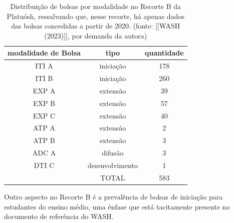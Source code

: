 \documentclass[
12pt,		%
openright,	%
twoside,  %
a4paper,			%
chapter=TITLE,		%
english,			%
french,				%
spanish,			%
brazil				%
]{USPSC-classe/USPSC}
\begin{document}
\noindent\begin{center}\mbox{\centering{}}\end{center}






\begin{table}[htb]
\tiny
\caption{\label{cebf2cae2f56b26b99c8f02cfed1eaed55d30c05}Distribui\c{c}\~ao de bolsas por modalidade no Recorte B da Platu\'osh, ressalvando que, nesse recorte, h\'a apenas dados das bolsas concedidas a partir de 2020. (fonte:  [[WASH (2023)]], por demanda da autora)}

\centering
\begin{tabular}{|c|c|c|}
\hline
modalidade de Bolsa  &  tipo  &  quantidade \\
\hline
ITI A  &  inicia\c{c}\~ao  &  178 \\
ITI B  &  inicia\c{c}\~ao  &  260 \\
EXP A  &  extens\~ao  &  39 \\
EXP B  &  extens\~ao  &  57 \\
EXP C  &  extens\~ao  &  40 \\
ATP A  &  extens\~ao  &  2 \\
ATP B  &  extens\~ao  &  3 \\
ADC A  &  difus\~ao  &  3 \\
DTI C  &  desenvolvimento  &  1 \\
\hline
  &  TOTAL  &  583 \\
\hline
\end{tabular}
\end{table}


Outro aspecto no Recorte B \'e a preval\^encia de bolsas de inicia\c{c}\~ao para estudantes do ensino m\'edio, uma \^enfase que est\'a tacitamente presente no documento de refer\^encia do WASH.









\noindent\begin{center}\mbox{\centering{}}\end{center}
\end{document}

